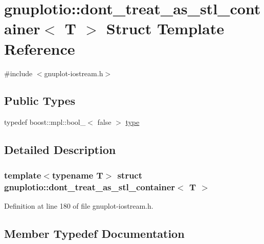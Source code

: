 \hypertarget{structgnuplotio_1_1dont__treat__as__stl__container}{}\section{gnuplotio\+:\+:dont\+\_\+treat\+\_\+as\+\_\+stl\+\_\+container$<$ T $>$ Struct Template Reference}
\label{structgnuplotio_1_1dont__treat__as__stl__container}


{\ttfamily \#include $<$gnuplot-\/iostream.\+h$>$}

\subsection*{Public Types}
\begin{DoxyCompactItemize}
\item 
typedef boost\+::mpl\+::bool\+\_\+$<$ false $>$ \hyperlink{structgnuplotio_1_1dont__treat__as__stl__container_aa4404164a7547142376a9140ef07fd2a}{type}
\end{DoxyCompactItemize}


\subsection{Detailed Description}
\subsubsection*{template$<$typename T$>$\newline
struct gnuplotio\+::dont\+\_\+treat\+\_\+as\+\_\+stl\+\_\+container$<$ T $>$}



Definition at line 180 of file gnuplot-\/iostream.\+h.



\subsection{Member Typedef Documentation}
\mbox{\label{structgnuplotio_1_1dont__treat__as__stl__container_aa4404164a7547142376a9140ef07fd2a}} 
